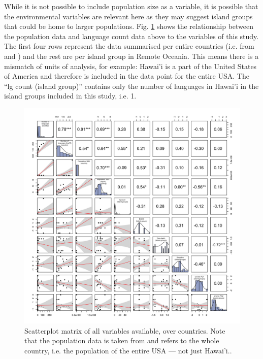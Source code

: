 \documentclass[unnumsec,webpdf,modern,medium]{oup-authoring-template}
\begin{document}
\begin{appendices}
While it is not possible to include population size as a variable, it is possible that the environmental variables are relevant here as they may suggest island groups that could be home to larger populations. Fig. \ref{SPLOM_country_all_variables} shows the relationship between the population data and language count data above to the variables of this study. The first four rows represent the data summarised per entire countries  (i.e. from  \citet{UN_pop} and \citet{glottolog4_5}) and the rest are per island group in Remote Oceania. This means there is a mismatch of units of analysis, for example: Hawai'i is a part of the United States of America and therefore is included in the data point for the entire USA. The ``lg count (island group)'' contains only the number of languages in Hawai'i in the island groups included in this study, i.e. 1.

\begin{figure}[ht]
    \includegraphics[width=\textwidth]{latex/SPLOM_country_all_variables.png}
\caption{Scatterplot matrix of all variables available, over countries. Note that the population data is taken from \citet{UN_pop} and refers to the whole country, i.e. the population of the entire USA --- not just Hawai'i..}
\label{SPLOM_country_all_variables}
\end{figure}



\end{appendices}
\end{document}
